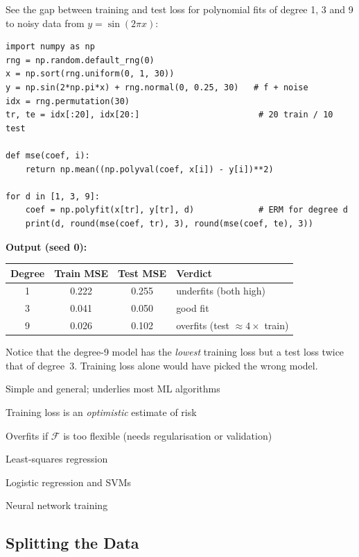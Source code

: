 \begin{tryit}
See the gap between training and test loss for polynomial fits of degree 1, 3 and 9 to noisy data from $y=\sin(2\pi x)$:
\begin{lstlisting}
import numpy as np
rng = np.random.default_rng(0)
x = np.sort(rng.uniform(0, 1, 30))
y = np.sin(2*np.pi*x) + rng.normal(0, 0.25, 30)   # f + noise
idx = rng.permutation(30)
tr, te = idx[:20], idx[20:]                        # 20 train / 10 test

def mse(coef, i):
    return np.mean((np.polyval(coef, x[i]) - y[i])**2)

for d in [1, 3, 9]:
    coef = np.polyfit(x[tr], y[tr], d)             # ERM for degree d
    print(d, round(mse(coef, tr), 3), round(mse(coef, te), 3))
\end{lstlisting}
\textbf{Output (seed 0):}
\begin{center}
\begin{tabular}{@{}cccl@{}}
\toprule
\textbf{Degree} & \textbf{Train MSE} & \textbf{Test MSE} & \textbf{Verdict}\\
\midrule
1 & 0.222 & 0.255 & underfits (both high)\\
3 & 0.041 & 0.050 & good fit\\
9 & 0.026 & 0.102 & overfits (test $\approx 4\times$ train)\\
\bottomrule
\end{tabular}
\end{center}
Notice that the degree-9 model has the \emph{lowest} training loss but a test loss twice that of degree~3. Training loss alone would have picked the wrong model.
\end{tryit}


{\item Simple and general; underlies most ML algorithms}
{\item Training loss is an \emph{optimistic} estimate of risk
 \item Overfits if $\mathcal F$ is too flexible (needs regularisation or validation)}
{\item Least-squares regression
 \item Logistic regression and SVMs
 \item Neural network training}

\subsection{Splitting the Data}

